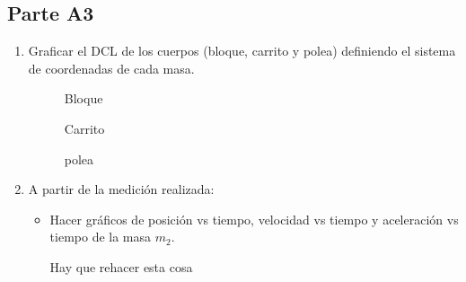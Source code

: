 \subsection{Parte A3}%
\label{sub:cues_parte_a3}

\begin{enumerate}
	\item Graficar el DCL de los cuerpos
		(bloque, carrito y polea)
		definiendo el sistema de coordenadas de cada masa.
		\begin{figure}[H]
			\centering
			
			\caption{Bloque}
			\label{fig:dcl_bloque}
		\end{figure}
		\begin{figure}[H]
			\centering
			
			\caption{Carrito}
			\label{fig:dcl_carro}
		\end{figure}
		\begin{figure}[H]
			\centering
			
			\caption{polea}
			\label{fig:dcl_polea}
		\end{figure}
	\item A partir de la medición realizada:
		\begin{itemize}
			\item Hacer gráficos de posición vs tiempo,
				velocidad vs tiempo y
				aceleración vs tiempo de la masa $m_2$.
				\begin{center}
					\huge{Hay que rehacer esta cosa}
				\end{center}
				\begin{figure}[H]
					\centering
					\label{fig:pos_vs_tmp}
				\end{figure}
				\begin{figure}[H]
					\centering
						\begin{tikzpicture}

\end{tikzpicture}
\end{figure}
\end{itemize}
\end{enumerate}
